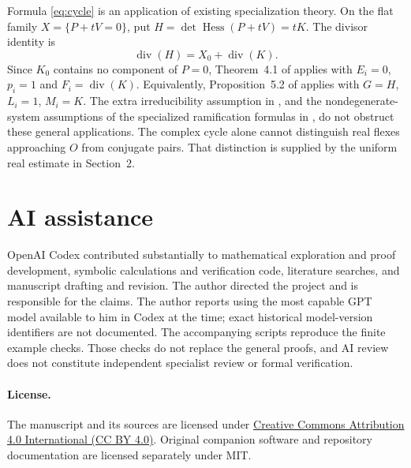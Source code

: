 \documentclass[11pt,a4paper]{article}
\theoremstyle{remark}
\newcommand{\Hess}{\operatorname{Hess}}
\begin{document}
Formula \eqref{eq:cycle} is an application of existing
specialization theory. On the flat family
\(X=\{P+tV=0\}\), put \(H=\det\Hess(P+tV)=tK\).
The divisor identity is
\[
                 \operatorname{div}(H)=X_0+\operatorname{div}(K).
\]
Since \(K_0\) contains no component of \(P=0\), Theorem~4.1
of \citet{esteves} applies with \(E_i=0\), \(p_i=1\) and
\(F_i=\operatorname{div}(K)\). Equivalently, Proposition~5.2
of \citet{ems} applies with \(G=H\), \(L_i=1\), \(M_i=K\).
The extra irreducibility assumption in
\citep[Example~5.3]{esteves}, and the nondegenerate-system
assumptions of the specialized ramification formulas in
\citep{ems}, do not obstruct these general applications.
The complex cycle alone cannot distinguish real flexes
approaching \(O\) from conjugate pairs. That distinction
is supplied by the uniform real estimate in
Section~2.

\section*{AI assistance}
OpenAI Codex contributed substantially to mathematical exploration and
proof development, symbolic calculations and verification code, literature
searches, and manuscript drafting and revision. The author directed the
project and is responsible for the claims. The author reports using the
most capable GPT model available to him in Codex at the time; exact
historical model-version identifiers are not documented.
The accompanying scripts reproduce the finite example checks. Those
checks do not replace the general proofs, and AI review does not
constitute independent specialist review or formal verification.

\paragraph{License.}
The manuscript and its sources are licensed under
\href{https://creativecommons.org/licenses/by/4.0/}{Creative Commons
Attribution 4.0 International (CC BY 4.0)}. Original companion software
and repository documentation are licensed separately under MIT.

\clearpage


\end{document}
